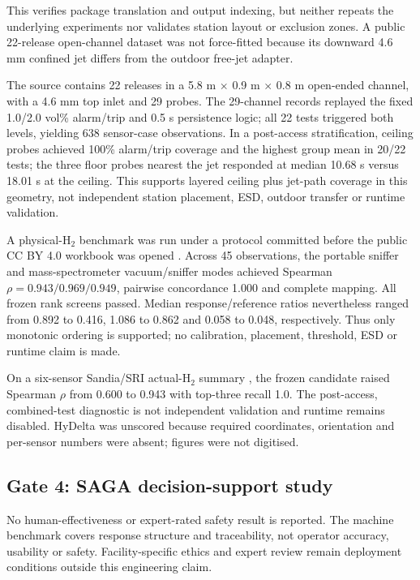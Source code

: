 \documentclass[12pt,a4paper]{article}
\begin{document}
This verifies package translation and output indexing, but neither repeats the
underlying experiments nor validates station layout or exclusion zones. A public
22-release open-channel dataset \cite{henriksen2025} was not force-fitted because
its downward 4.6 mm confined jet differs from the outdoor free-jet adapter.

The source contains 22 releases in a 5.8 m $\times$ 0.9 m $\times$ 0.8 m
open-ended channel, with a 4.6 mm top inlet and 29 probes.
The 29-channel records replayed the fixed 1.0/2.0 vol\% alarm/trip and 0.5 s
persistence logic; all 22 tests triggered both levels, yielding 638 sensor-case
observations. In a post-access stratification, ceiling probes achieved 100\%
alarm/trip coverage and the highest group mean in 20/22 tests; the three floor
probes nearest the jet responded at median 10.68 s versus 18.01 s at the ceiling. This
supports layered ceiling plus jet-path coverage in this geometry, not independent
station placement, ESD, outdoor transfer or runtime validation.

A physical-H$_2$ benchmark was run under a protocol committed before the
public CC BY 4.0 workbook was opened \cite{ferreira2024}. Across 45 observations,
the portable sniffer and mass-spectrometer vacuum/sniffer modes achieved Spearman
$\rho=0.943/0.969/0.949$, pairwise concordance 1.000 and complete mapping. All
frozen rank screens passed. Median response/reference ratios nevertheless ranged
from 0.892 to 0.416, 1.086 to 0.862 and 0.058 to 0.048, respectively. Thus only
monotonic ordering is supported; no calibration, placement, threshold, ESD or
runtime claim is made.

On a six-sensor Sandia/SRI actual-H$_2$ summary \cite{ekoto2012,gexcon2025}, the
frozen candidate raised Spearman $\rho$ from 0.600 to 0.943 with top-three recall
1.0. The post-access, combined-test diagnostic is not independent validation and
runtime remains disabled. HyDelta was unscored because required coordinates,
orientation and per-sensor numbers were absent; figures were not digitised.

\subsection{Gate 4: SAGA decision-support study}
No human-effectiveness or expert-rated safety result is reported. The machine
benchmark covers response structure and traceability, not operator accuracy,
usability or safety. Facility-specific ethics and expert review remain deployment
conditions outside this engineering claim.
\end{document}
